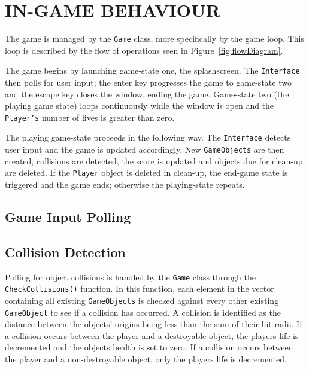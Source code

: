 \documentclass[10pt,twocolumn]{witseiepaper}
\begin{document}
\section{IN-GAME BEHAVIOUR}

The game is managed by the \texttt{Game} class, more specifically by the game loop. This loop is described by the flow of operations seen in Figure~\ref{fig:flowDiagram}. 



The game begins by launching game-state one, the splashscreen. The \texttt{Interface} then polls for user input; the enter key progresses the game to game-state two and the escape key closes the window, ending the game. Game-state two (the playing game state) loops continuously while the window is open and the \texttt{Player's} number of lives is greater than zero. 

The playing game-state proceeds in the following way. The \texttt{Interface} detects user input and the game is updated accordingly. New \texttt{GameObjects} are then created, collisions are detected, the score is updated and objects due for clean-up are deleted. If the \texttt{Player} object is deleted in clean-up, the end-game state is triggered and the game ends; otherwise the playing-state repeats.

\subsection{Game Input Polling}



\subsection{Collision Detection}

Polling for object collisions is handled by the \texttt{Game} class through the \texttt{CheckCollisions()} function. In this function, each element in the vector containing all existing \texttt{GameObjects} is checked against every other existing \texttt{GameObject} to see if a collision has occurred. A collision is identified as the distance between the objects' origins being less than the sum of their hit radii. If a collision occurs between the player and a destroyable object, the players life is decremented and the objects health is set to zero. If a collision occurs between the player and a non-destroyable object, only the players life is decremented.
\end{document}
